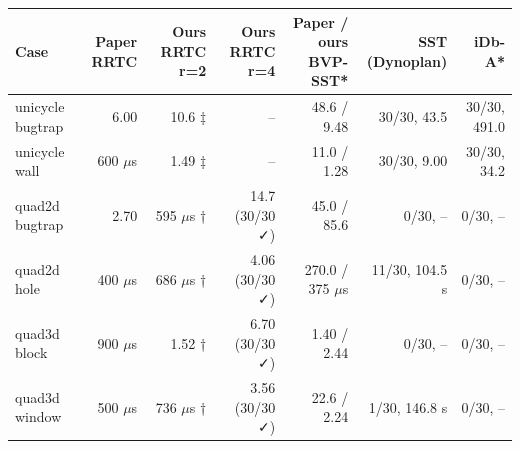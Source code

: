 \documentclass[border=4pt]{standalone}
\begin{document}
\begin{tabular}{lrrrrrr}
\toprule
\textbf{Case} & \textbf{Paper RRTC} & \textbf{Ours RRTC r=2} & \textbf{Ours RRTC r=4} & \textbf{Paper / ours BVP-SST*} & \textbf{SST (Dynoplan)} & \textbf{iDb-A*} \\
\midrule
unicycle bugtrap & 6.00 & 10.6 ‡ & -- & 48.6 / 9.48 & 30/30, 43.5 & 30/30, 491.0 \\
unicycle wall & 600 $\mu$s & 1.49 ‡ & -- & 11.0 / 1.28 & 30/30, 9.00 & 30/30, 34.2 \\
quad2d bugtrap & 2.70 & 595 $\mu$s † & 14.7 (30/30 ✓) & 45.0 / 85.6 & 0/30, -- & 0/30, -- \\
quad2d hole & 400 $\mu$s & 686 $\mu$s † & 4.06 (30/30 ✓) & 270.0 / 375 $\mu$s & 11/30, 104.5 s & 0/30, -- \\
quad3d block & 900 $\mu$s & 1.52 † & 6.70 (30/30 ✓) & 1.40 / 2.44 & 0/30, -- & 0/30, -- \\
quad3d window & 500 $\mu$s & 736 $\mu$s † & 3.56 (30/30 ✓) & 22.6 / 2.24 & 1/30, 146.8 s & 0/30, -- \\
\bottomrule
\end{tabular}
\end{document}
